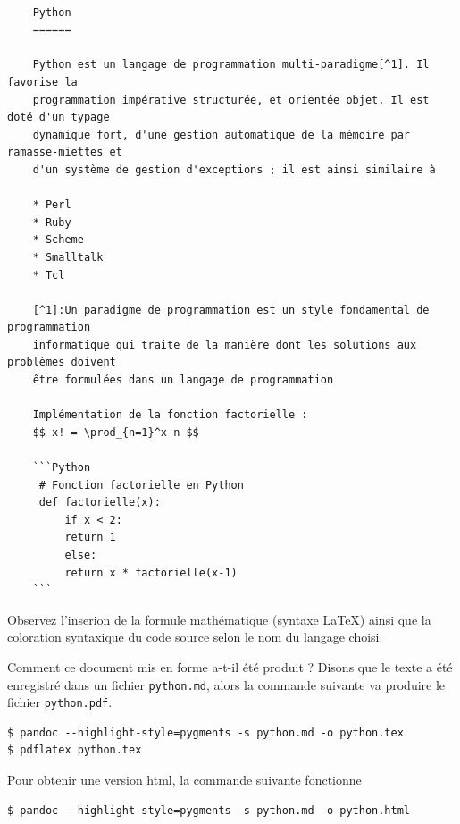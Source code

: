 \documentclass[]{article}
\begin{document}
\begin{verbatim}

    Python
    ======

    Python est un langage de programmation multi-paradigme[^1]. Il favorise la
    programmation impérative structurée, et orientée objet. Il est doté d'un typage
    dynamique fort, d'une gestion automatique de la mémoire par ramasse-miettes et
    d'un système de gestion d'exceptions ; il est ainsi similaire à 

    * Perl
    * Ruby
    * Scheme
    * Smalltalk
    * Tcl

    [^1]:Un paradigme de programmation est un style fondamental de programmation
    informatique qui traite de la manière dont les solutions aux problèmes doivent
    être formulées dans un langage de programmation

    Implémentation de la fonction factorielle :
    $$ x! = \prod_{n=1}^x n $$

    ```Python
     # Fonction factorielle en Python
     def factorielle(x):
         if x < 2:
         return 1
         else:
         return x * factorielle(x-1)
    ```
\end{verbatim}
Observez l'inserion de la formule mathématique (syntaxe LaTeX) ainsi que
la coloration syntaxique du code source selon le nom du langage choisi.

Comment ce document mis en forme a-t-il été produit ? Disons que le
texte a été enregistré dans un fichier \texttt{python.md}, alors la
commande suivante va produire le fichier \texttt{python.pdf}.

\begin{verbatim}
$ pandoc --highlight-style=pygments -s python.md -o python.tex
$ pdflatex python.tex
\end{verbatim}
Pour obtenir une version html, la commande suivante fonctionne

\begin{verbatim}
$ pandoc --highlight-style=pygments -s python.md -o python.html
\end{verbatim}
\end{document}
